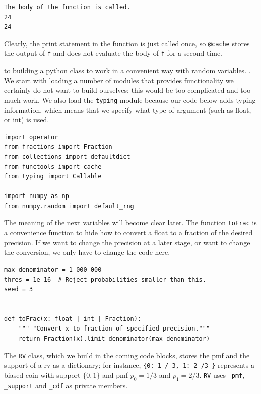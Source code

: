 \documentclass[queueing-book]{subfiles}
\begin{document}
\begin{verbatim}
The body of the function is called.
24
24
\end{verbatim}

Clearly, the print statement in the function is just called once, so \texttt{@cache} stores the output of \texttt{f} and does not evaluate the body of \texttt{f} for a second time.



 to building a python class to work in a convenient way with random variables.
.
We start with loading a number of modules that provides functionality we certainly do not want to build ourselves; this would be too complicated and too much work.
We also load the \texttt{typing} module because our code below adds typing information, which means that we specify what type of argument (such as float, or int) is used.
\begin{verbatim}
import operator
from fractions import Fraction
from collections import defaultdict
from functools import cache
from typing import Callable

import numpy as np
from numpy.random import default_rng
\end{verbatim}

The meaning of the next variables will become clear later.
The function \texttt{toFrac} is a convenience function to hide how to convert a float to a fraction of the desired precision.
If we want to change the precision at a later stage, or want to change the conversion, we only have to change the code here.
\begin{verbatim}
max_denominator = 1_000_000
thres = 1e-16  # Reject probabilities smaller than this.
seed = 3


def toFrac(x: float | int | Fraction):
    """ "Convert x to fraction of specified precision."""
    return Fraction(x).limit_denominator(max_denominator)
\end{verbatim}

The \texttt{RV} class, which we build in the coming code blocks, stores the pmf and the support of a rv as a dictionary; for instance, \texttt{\{0: 1 / 3, 1: 2 /3 \}} represents a biased coin with support \(\{0, 1\}\) and pmf \(p_{0} = 1/3\) and \(p_{1} = 2/3\). \texttt{RV} uses \texttt{\_pmf}, \texttt{\_support} and \texttt{\_cdf} as private members.
\end{document}
